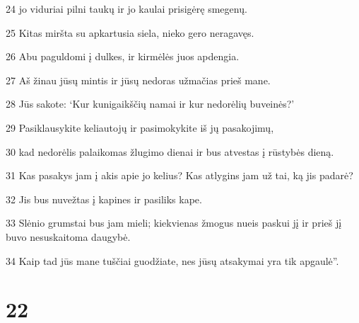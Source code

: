 \par 24 jo viduriai pilni taukų ir jo kaulai prisigėrę smegenų. 
\par 25 Kitas miršta su apkartusia siela, nieko gero neragavęs. 
\par 26 Abu paguldomi į dulkes, ir kirmėlės juos apdengia. 
\par 27 Aš žinau jūsų mintis ir jūsų nedoras užmačias prieš mane. 
\par 28 Jūs sakote: ‘Kur kunigaikščių namai ir kur nedorėlių buveinės?’ 
\par 29 Pasiklausykite keliautojų ir pasimokykite iš jų pasakojimų, 
\par 30 kad nedorėlis palaikomas žlugimo dienai ir bus atvestas į rūstybės dieną. 
\par 31 Kas pasakys jam į akis apie jo kelius? Kas atlygins jam už tai, ką jis padarė? 
\par 32 Jis bus nuvežtas į kapines ir pasiliks kape. 
\par 33 Slėnio grumstai bus jam mieli; kiekvienas žmogus nueis paskui jį ir prieš jį buvo nesuskaitoma daugybė. 
\par 34 Kaip tad jūs mane tuščiai guodžiate, nes jūsų atsakymai yra tik apgaulė”.



\chapter{22}


